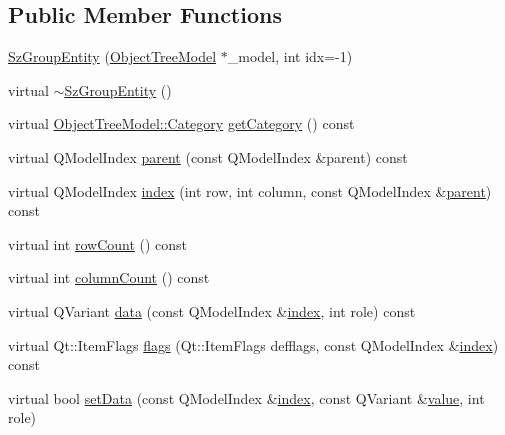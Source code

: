 \subsection*{Public Member Functions}
\begin{DoxyCompactItemize}
\item 
\mbox{\hyperlink{classobjecttree_1_1_sz_group_entity_ad62dea90950110b723bec79b5ab7f95a}{Sz\+Group\+Entity}} (\mbox{\hyperlink{class_object_tree_model}{Object\+Tree\+Model}} $\ast$\+\_\+model, int idx=-\/1)
\item 
virtual \mbox{\hyperlink{classobjecttree_1_1_sz_group_entity_a31cc8f6bc7a58864df6428a32cbd5a2d}{$\sim$\+Sz\+Group\+Entity}} ()
\item 
virtual \mbox{\hyperlink{class_object_tree_model_a379e9d6b0d381853785adf62095ba4e3}{Object\+Tree\+Model\+::\+Category}} \mbox{\hyperlink{classobjecttree_1_1_sz_group_entity_a1332a46cbd951c96c77c389e524f3846}{get\+Category}} () const
\item 
virtual Q\+Model\+Index \mbox{\hyperlink{classobjecttree_1_1_sz_group_entity_a294760034d11ac1477c86741603d6dea}{parent}} (const Q\+Model\+Index \&parent) const
\item 
virtual Q\+Model\+Index \mbox{\hyperlink{classobjecttree_1_1_sz_group_entity_ac467abe2de104e9f99c0e1520d4a2053}{index}} (int row, int column, const Q\+Model\+Index \&\mbox{\hyperlink{classobjecttree_1_1_sz_group_entity_a294760034d11ac1477c86741603d6dea}{parent}}) const
\item 
virtual int \mbox{\hyperlink{classobjecttree_1_1_sz_group_entity_a5c47d480f3e52987053974d393329e86}{row\+Count}} () const
\item 
virtual int \mbox{\hyperlink{classobjecttree_1_1_sz_group_entity_a197c30bc35777ad8855848b2609a9703}{column\+Count}} () const
\item 
virtual Q\+Variant \mbox{\hyperlink{classobjecttree_1_1_sz_group_entity_acc2ac6ed31f26c3948efbd6066a0933a}{data}} (const Q\+Model\+Index \&\mbox{\hyperlink{classobjecttree_1_1_sz_group_entity_ac467abe2de104e9f99c0e1520d4a2053}{index}}, int role) const
\item 
virtual Qt\+::\+Item\+Flags \mbox{\hyperlink{classobjecttree_1_1_sz_group_entity_a054fe370e7cb70ac63fe10d6a1d936be}{flags}} (Qt\+::\+Item\+Flags defflags, const Q\+Model\+Index \&\mbox{\hyperlink{classobjecttree_1_1_sz_group_entity_ac467abe2de104e9f99c0e1520d4a2053}{index}}) const
\item 
virtual bool \mbox{\hyperlink{classobjecttree_1_1_sz_group_entity_a603dac80d7edb8ba7fd175ebe9acb1da}{set\+Data}} (const Q\+Model\+Index \&\mbox{\hyperlink{classobjecttree_1_1_sz_group_entity_ac467abe2de104e9f99c0e1520d4a2053}{index}}, const Q\+Variant \&\mbox{\hyperlink{diffusion_8cpp_a4b41795815d9f3d03abfc739e666d5da}{value}}, int role)
\end{DoxyCompactItemize}
